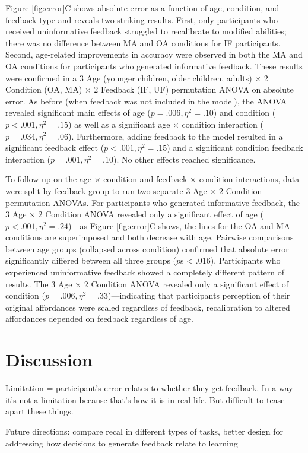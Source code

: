 \documentclass[a4paper,man,natbib,floatsintext,noextraspace]{apa6}
\begin{document}
Figure \ref{fig:error}C shows absolute error as a function of age, condition, and feedback type and reveals two striking results. First, only participants who received uninformative feedback struggled to recalibrate to modified abilities; there was no difference between MA and OA conditions for IF participants. Second, age-related improvements in accuracy were observed in both the MA and OA conditions for participants who generated informative feedback. These results were confirmed in a 3 Age (younger children, older children, adults) × 2 Condition (OA, MA) × 2 Feedback (IF, UF) permutation ANOVA on absolute error. As before (when feedback was not included in the model), the ANOVA revealed significant main effects of age ($p = .006, \eta^{2} = .10$) and condition ($p < .001, \eta^{2} = .15$) as well as a significant age × condition interaction ($p = .034, \eta^{2} = .06$). Furthermore, adding feedback to the model resulted in a significant feedback effect ($p < .001, \eta^{2} = .15$) and a significant condition feedback interaction ($p = .001, \eta^{2} = .10$). No other effects reached significance. 

To follow up on the age × condition and feedback × condition interactions, data were split by feedback group to run two separate 3 Age × 2 Condition permutation ANOVAs. For participants who generated informative feedback, the 3 Age × 2 Condition ANOVA revealed only a significant effect of age ($p < .001, \eta^{2} = .24$)---as Figure \ref{fig:error}C shows, the lines for the OA and MA conditions are superimposed and both decrease with age. Pairwise comparisons between age groups (collapsed across condition) confirmed that absolute error significantly differed between all three groups ($p$s < .016). Participants who experienced uninformative feedback showed a completely different pattern of results. The 3 Age × 2 Condition ANOVA revealed only a significant effect of condition ($p = .006, \eta^{2} = .33$)---indicating that participants perception of their original affordances were scaled regardless of feedback, recalibration to altered affordances depended on feedback regardless of age.

\section{Discussion}
Limitation = participant's error relates to whether they get feedback. In a way it's not a limitation because that's how it is in real life. But difficult to tease apart these things.

Future directions: compare recal in different types of tasks, better design for addressing how decisions to generate feedback relate to learning



\end{document}
